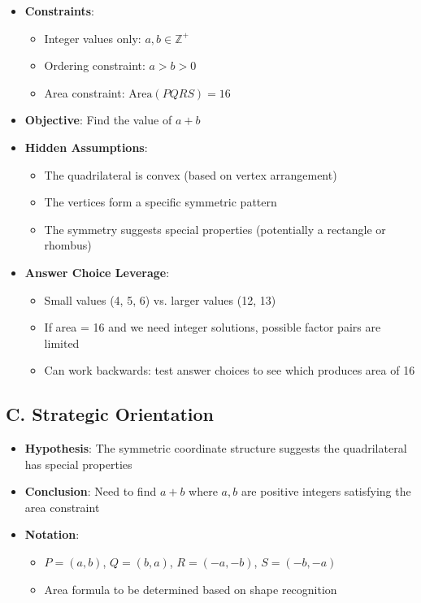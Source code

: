 \documentclass[]{article}
\begin{document}
\begin{problemconfigbox}
\begin{itemize}[leftmargin=*]
    \item \textbf{Constraints}: 
    \begin{itemize}
        \item Integer values only: $a, b \in \mathbb{Z}^+$
        \item Ordering constraint: $a > b > 0$
        \item Area constraint: $\text{Area}(PQRS) = 16$
    \end{itemize}
    
    \item \textbf{Objective}: Find the value of $a+b$
    
    \item \textbf{Hidden Assumptions}: 
    \begin{itemize}
        \item The quadrilateral is convex (based on vertex arrangement)
        \item The vertices form a specific symmetric pattern
        \item The symmetry suggests special properties (potentially a rectangle or rhombus)
    \end{itemize}
    
    \item \textbf{Answer Choice Leverage}: 
    \begin{itemize}
        \item Small values (4, 5, 6) vs. larger values (12, 13)
        \item If area = 16 and we need integer solutions, possible factor pairs are limited
        \item Can work backwards: test answer choices to see which produces area of 16
    \end{itemize}
\end{itemize}

\subsection*{C. Strategic Orientation}
\begin{itemize}[leftmargin=*]
    \item \textbf{Hypothesis}: The symmetric coordinate structure suggests the quadrilateral has special properties
    
    \item \textbf{Conclusion}: Need to find $a+b$ where $a,b$ are positive integers satisfying the area constraint
    
    \item \textbf{Notation}: 
    \begin{itemize}
        \item $P = (a,b)$, $Q = (b,a)$, $R = (-a,-b)$, $S = (-b,-a)$
        \item Area formula to be determined based on shape recognition
    \end{itemize}
    

\end{itemize}
\end{problemconfigbox}
\end{document}
